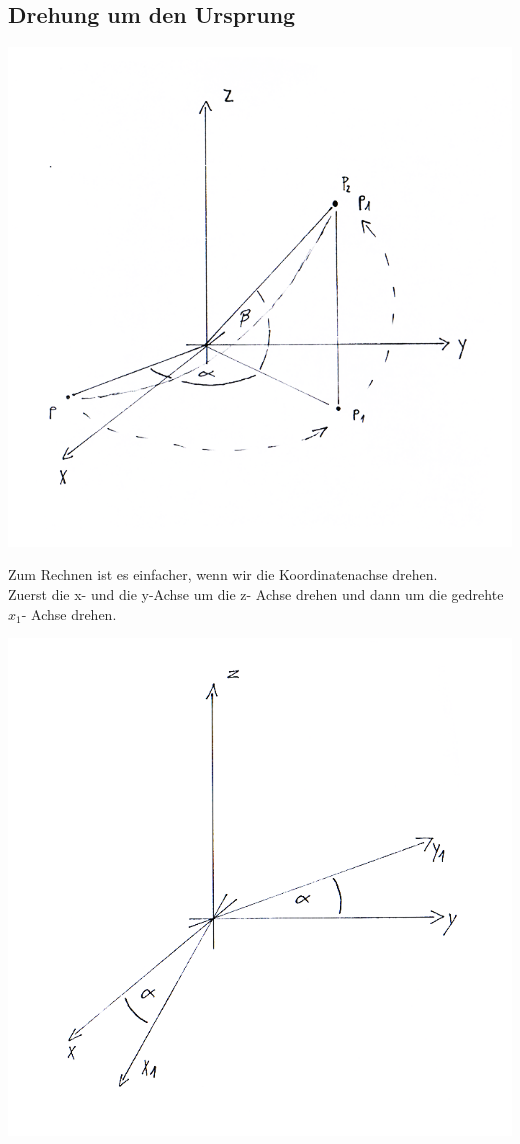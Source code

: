 \documentclass[a4paper,10pt]{report}
\begin{document}
\subsection{Drehung um den Ursprung}
\begin{center}
	 \includegraphics[width=\textwidth]{imgs/drehungUmUrsprung1.png}
\end{center}
Zum Rechnen ist es einfacher, wenn wir die Koordinatenachse drehen.\\
Zuerst die x- und die y-Achse um die z- Achse drehen und dann um die gedrehte $x_1$- Achse drehen.
\begin{center}
	 \includegraphics[width=\textwidth]{imgs/drehungUmUrsprung2.png}
\end{center}
\end{document}
